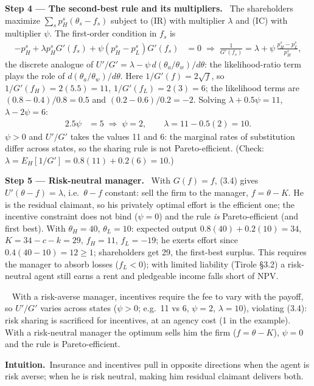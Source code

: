 \documentclass[11pt,a4paper]{article}
\newcommand{\step}[2]{\par\medskip\noindent\textbf{Step #1 --- #2.}~}
\newcommand{\intuition}{\par\medskip\noindent\textbf{Intuition.}~}
\newcommand{\answer}[1]{\par\smallskip\noindent\fbox{\textbf{Answer #1.}}~}
\begin{document}
\step{4}{The second-best rule and its multipliers} The shareholders maximize $\sum_s p^s_H(\theta_s-f_s)$ subject to (IR) with multiplier $\lambda$ and (IC) with multiplier $\psi$. The first-order condition in $f_s$ is
\begin{align}
  -p^s_H + \lambda p^s_H G'(f_s) + \psi(p^s_H-p^s_L)G'(f_s) &= 0
  \;\Longrightarrow\; \frac{1}{G'(f_s)} = \lambda + \psi\,\frac{p^s_H-p^s_L}{p^s_H}, \label{r8be14-rule}
\end{align}
the discrete analogue of $U'/G'=\lambda-\psi\,d(\theta_a/\theta_w)/d\theta$: the likelihood-ratio term plays the role of $d(\theta_a/\theta_w)/d\theta$. Here $1/G'(f)=2\sqrt f$, so $1/G'(f_H)=2(5.5)=11$, $1/G'(f_L)=2(3)=6$; the likelihood terms are $(0.8-0.4)/0.8=0.5$ and $(0.2-0.6)/0.2=-2$. Solving $\lambda+0.5\psi=11$, $\lambda-2\psi=6$:
\begin{align}
  2.5\psi &= 5 \;\Rightarrow\; \psi = 2, \qquad \lambda = 11-0.5(2) = 10. \label{r8be14-mult}
\end{align}
$\psi>0$ and $U'/G'$ takes the values 11 and 6: the marginal rates of substitution differ across states, so the sharing rule is not Pareto-efficient. (Check: $\lambda=E_H[1/G']=0.8(11)+0.2(6)=10$.)

\step{5}{Risk-neutral manager} With $G(f)=f$, (3.4) gives $U'(\theta-f)=\lambda$, i.e.\ $\theta-f$ constant: sell the firm to the manager, $f=\theta-K$. He is the residual claimant, so his privately optimal effort is the efficient one; the incentive constraint does not bind ($\psi=0$) and the rule \emph{is} Pareto-efficient (and first best). With $\theta_H=40$, $\theta_L=10$: expected output $0.8(40)+0.2(10)=34$, $K=34-c-k=29$, $f_H=11$, $f_L=-19$; he exerts effort since $0.4(40-10)=12\ge1$; shareholders get 29, the first-best surplus. This requires the manager to absorb losses ($f_L<0$); with limited liability (Tirole \S3.2) a risk-neutral agent still earns a rent and pledgeable income falls short of NPV.

\answer{} With a risk-averse manager, incentives require the fee to vary with the payoff, so $U'/G'$ varies across states ($\psi>0$; e.g.\ 11 vs 6, $\psi=2$, $\lambda=10$), violating (3.4): risk sharing is sacrificed for incentives, at an agency cost (1 in the example). With a risk-neutral manager the optimum sells him the firm ($f=\theta-K$), $\psi=0$ and the rule is Pareto-efficient.

\intuition Insurance and incentives pull in opposite directions when the agent is risk averse; when he is risk neutral, making him residual claimant delivers both.
\end{document}
